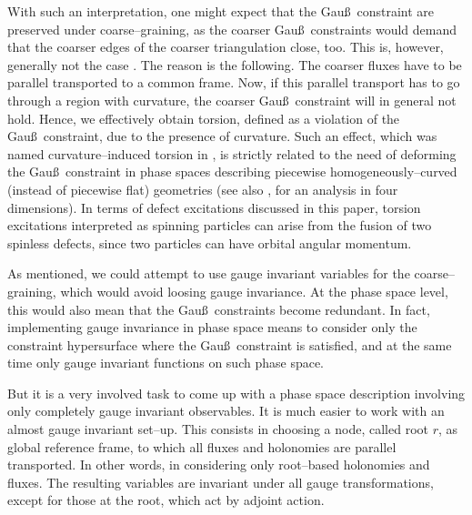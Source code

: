 \documentclass[nofootinbib,superscriptaddress,eqsecnum,tightenlines,11pt]{revtex4-1}
\begin{document}
With such an interpretation, one might expect that the Gau\ss~constraint are preserved under coarse--graining, as the coarser Gau\ss~constraints would demand that the coarser edges of the coarser triangulation close, too. 
This is, however, generally not the case \cite{DG14b}. The reason is the following.
The coarser fluxes have to be parallel transported to a common frame. 
Now, if this parallel transport has to go through a region with curvature, the coarser Gau\ss~constraint will in general not hold. %
 Hence, we effectively obtain torsion, defined as a violation of the Gau\ss~constraint, due to the presence of curvature. 
Such an effect, which was named curvature--induced torsion in \cite{DG14b}, is strictly related to the need of deforming the Gau\ss~constraint in phase spaces describing piecewise homogeneously--curved  (instead of piecewise flat) geometries \cite{NewRegge, BonzomEtAl, Flo2,EteraCharles} (see also \cite{HHR-AHP16}, for an analysis in four dimensions).
In terms of defect excitations discussed in this paper,  torsion excitations interpreted as spinning particles can arise from the fusion of two spinless defects, since two particles can have orbital angular momentum. %


As mentioned, we could attempt to use gauge invariant variables for the coarse--graining, which would avoid loosing gauge invariance. 
At the phase space level, this would also mean that the Gau\ss~constraints become redundant. 
In fact, implementing gauge invariance in phase space means to consider only the constraint hypersurface where the Gau\ss~constraint is satisfied, and at the same time only gauge invariant functions on such phase space.%

But it is a very involved task to come up with a phase space description involving only completely gauge invariant observables. 
It is much easier to work with an almost gauge invariant set--up.
This consists in choosing a node, called root $r$, as global reference frame, to which all fluxes and holonomies are parallel transported.
In other words, in considering only   root--based holonomies and fluxes.
The resulting variables are invariant under all gauge transformations, except for those at the root, which act by adjoint action.
\end{document}
